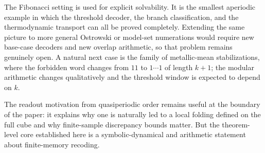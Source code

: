 The Fibonacci setting is used for explicit solvability. It is the smallest aperiodic example in which the threshold decoder, the branch classification, and the thermodynamic transport can all be proved completely. Extending the same picture to more general Ostrowski or model-set numerations would require new base-case decoders and new overlap arithmetic, so that problem remains genuinely open. A natural next case is the family of metallic-mean stabilizations, where the forbidden word changes from $11$ to $1\cdots 1$ of length $k+1$; the modular arithmetic changes qualitatively and the threshold window is expected to depend on $k$.

The readout motivation from quasiperiodic order remains useful at the boundary of the paper: it explains why one is naturally led to a local folding defined on the full cube and why finite-sample discrepancy bounds matter. But the theorem-level core established here is a symbolic-dynamical and arithmetic statement about finite-memory recoding.
